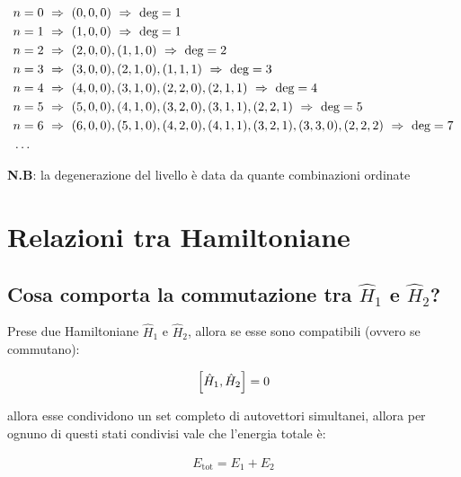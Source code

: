 \begin{align*}
	& n = 0 \,\, \Rightarrow \,\, \qty(0, 0, 0) \,\, \Rightarrow \,\, \text{deg} = 1 \\
	& n = 1 \,\, \Rightarrow \,\, \qty(1, 0, 0) \,\, \Rightarrow \,\, \text{deg} = 1 \\
	& n = 2  \,\, \Rightarrow \,\, \qty(2, 0, 0), \qty(1, 1, 0) \,\, \Rightarrow \,\, \text{deg} = 2 \\
	& n = 3  \,\, \Rightarrow \,\, \qty(3, 0, 0), \qty(2, 1, 0), \qty(1, 1, 1)\,\, \Rightarrow \,\, \text{deg} = 3 \\
	& n = 4  \,\, \Rightarrow \,\, \qty(4, 0, 0), \qty(3, 1, 0), \qty(2, 2, 0), \qty(2, 1, 1) \,\, \Rightarrow \,\, \text{deg} = 4 \\
	& n = 5  \,\, \Rightarrow \,\, \qty(5, 0, 0), \qty(4, 1, 0), \qty(3, 2, 0), \qty(3, 1, 1), \qty(2, 2, 1)\,\, \Rightarrow \,\, \text{deg} = 5 \\
	& n = 6  \,\, \Rightarrow \,\, \qty(6, 0, 0), \qty(5, 1, 0), \qty(4, 2, 0), \qty(4, 1, 1), \qty(3, 2, 1), \qty(3, 3, 0), \qty(2, 2, 2) \,\, \Rightarrow \,\, \text{deg} = 7\\
	& \ldots
\end{align*}

	\textbf{N.B}: la degenerazione del livello è data da quante combinazioni ordinate 




\section{Relazioni tra Hamiltoniane}

\subsection{Cosa comporta la commutazione tra $\hat{H}_1$ e $\hat{H}_2$?}

	Prese due Hamiltoniane $\hat{H}_1$ e $\hat{H}_2$, allora se esse sono compatibili (ovvero se commutano):
	
\begin{align*}
	\qty[\hat{H}_1,\hat{H}_2] = 0
\end{align*}

	allora esse condividono un set completo di autovettori simultanei, allora per ognuno di questi stati condivisi vale che l'energia totale è:
	
\begin{align*}
	E_{\text{tot}} = E_1 + E_2
\end{align*}



